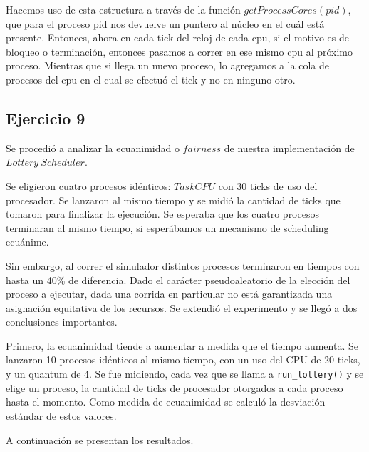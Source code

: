 \documentclass[11pt, a4paper, twoside]{article}
\begin{document}
Hacemos uso de esta estructura a través de la función $getProcessCores(pid)$, que para 
el proceso pid nos devuelve un puntero al núcleo en el cuál está presente. Entonces, ahora
en cada tick del reloj de cada cpu, si el motivo es de bloqueo o terminación, entonces pasamos a correr en ese mismo
cpu al próximo proceso. Mientras que si llega un nuevo proceso, lo agregamos a la cola de procesos del cpu
en el cual se efectuó el tick y no en ninguno otro. 






\clearpage
\subsection{Ejercicio 9}

Se procedió a analizar la ecuanimidad o $fairness$ de nuestra implementación de $Lottery\ Scheduler$.

Se eligieron cuatro procesos idénticos: $TaskCPU$ con 30 ticks de uso del procesador. Se lanzaron al mismo tiempo y se midió la cantidad de ticks que tomaron para finalizar la ejecución. Se esperaba que los cuatro procesos terminaran al mismo tiempo, si esperábamos un mecanismo de scheduling ecuánime.

Sin embargo, al correr el simulador distintos procesos terminaron en tiempos con hasta un 40\% de diferencia. Dado el carácter pseudoaleatorio de la elección del proceso a ejecutar, dada una corrida en particular no está garantizada una asignación equitativa de los recursos. Se extendió el experimento y se llegó a dos conclusiones importantes.

Primero, la ecuanimidad tiende a aumentar a medida que el tiempo aumenta. Se lanzaron 10 procesos idénticos al mismo tiempo, con un uso del CPU de 20 ticks, y un quantum de 4. Se fue midiendo, cada vez que se llama a \texttt{run\_lottery()} y se elige un proceso, la cantidad de ticks de procesador otorgados a cada proceso hasta el momento. Como medida de ecuanimidad se calculó la desviación estándar de estos valores.

A continuación se presentan los resultados.
\end{document}
